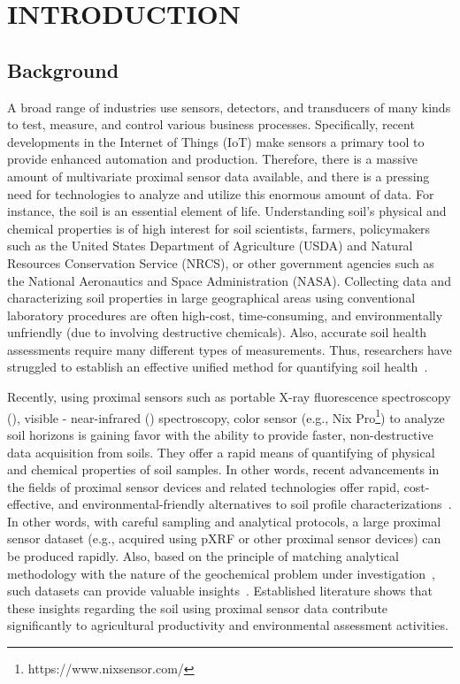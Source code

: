 \chapter{INTRODUCTION}
\label{chpt:introduction}
\section{Background}
A broad range of industries use sensors, detectors, and transducers of many kinds to test, measure, and control various business processes. Specifically, recent developments in the Internet of Things (IoT) make sensors a primary tool to provide enhanced automation and production. Therefore, there is a massive amount of multivariate proximal sensor data available, and there is a pressing need for technologies to analyze and utilize this enormous amount of data. For instance, the soil is an essential element of life. Understanding soil's physical and chemical properties is of high interest for soil scientists, farmers, policymakers such as the United States Department of Agriculture (USDA) and Natural Resources Conservation Service (NRCS), or other government agencies such as the National Aeronautics and Space Administration (NASA). Collecting data and characterizing soil properties in large geographical areas using conventional laboratory procedures are often high-cost, time-consuming, and environmentally unfriendly (due to involving destructive chemicals). Also, accurate soil health assessments require many different types of measurements. Thus, researchers have struggled to establish an effective unified method for quantifying soil health~\cite{Wang2015Synthesized, pham2019soaviz}. 

Recently, using proximal sensors such as portable X-ray fluorescence spectroscopy (\pxrf{}), visible - near-infrared (\visnir{}) spectroscopy, color sensor (e.g., Nix Pro\footnote{https://www.nixsensor.com/}) to analyze soil horizons is gaining favor with the ability to provide faster, non-destructive data acquisition from soils. They offer a rapid means of quantifying of physical and chemical properties of soil samples. In other words, recent advancements in the fields of proximal sensor devices and related technologies offer rapid, cost-effective, and environmental-friendly alternatives to soil profile characterizations~\cite{Legoria2012, Paulette2015, Stockmann2016, Guilherme2018, sun2020enhanced}. In other words, with careful sampling and analytical protocols, a large proximal sensor dataset (e.g., acquired using pXRF or other proximal sensor devices) can be produced rapidly. Also, based on the principle of matching analytical methodology with the nature of the geochemical problem under investigation~\cite{paul2010fit}, such datasets can provide valuable insights~\cite{gazley20113d}. Established literature shows that these insights regarding the soil using proximal sensor data contribute significantly to agricultural productivity and environmental assessment activities.

